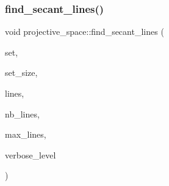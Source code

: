 \mbox{\label{classprojective__space_a0c55a77fc37bdb5ee06a33436811afde}} 
\subsubsection{\texorpdfstring{find\+\_\+secant\+\_\+lines()}{find\_secant\_lines()}\hspace{0.1cm}{\footnotesize\ttfamily [1/2]}}
{\footnotesize\ttfamily void projective\+\_\+space\+::find\+\_\+secant\+\_\+lines (\begin{DoxyParamCaption}\item[{\mbox{\hyperlink{galois_8h_a09fddde158a3a20bd2dcadb609de11dc}{I\+NT}} $\ast$}]{set,  }\item[{\mbox{\hyperlink{galois_8h_a09fddde158a3a20bd2dcadb609de11dc}{I\+NT}}}]{set\+\_\+size,  }\item[{\mbox{\hyperlink{galois_8h_a09fddde158a3a20bd2dcadb609de11dc}{I\+NT}} $\ast$}]{lines,  }\item[{\mbox{\hyperlink{galois_8h_a09fddde158a3a20bd2dcadb609de11dc}{I\+NT}} \&}]{nb\+\_\+lines,  }\item[{\mbox{\hyperlink{galois_8h_a09fddde158a3a20bd2dcadb609de11dc}{I\+NT}}}]{max\+\_\+lines,  }\item[{\mbox{\hyperlink{galois_8h_a09fddde158a3a20bd2dcadb609de11dc}{I\+NT}}}]{verbose\+\_\+level }\end{DoxyParamCaption})}

\mbox{\label{classprojective__space_aeea055d57a5df64b2a2038c68f456d45}} 

